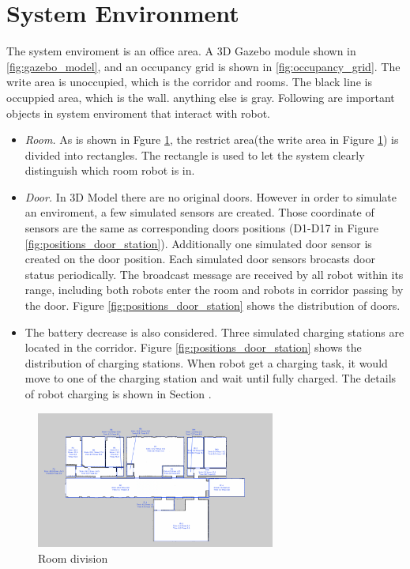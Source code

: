 \section{System Environment}
The system enviroment is an office area. A 3D Gazebo module shown in \ref{fig:gazebo_model}, and an occupancy grid is shown in \ref{fig:occupancy_grid}. The write area is unoccupied, which is the corridor and rooms. The black line is occuppied area, which is the wall. anything else is gray.
Following are important objects in system enviroment that interact with robot.
\begin{itemize}
	\item \textsl{Room.} As is shown in Fgure \ref{fig:room_division}, the restrict area(the write area in Figure \ref{fig:room_division}) is divided into rectangles. The rectangle is used to let the system clearly distinguish which room robot is in.
	\item \textsl{Door.} In 3D Model there are no original doors. However in order to simulate an enviroment, a few simulated sensors are created. Those coordinate of sensors are the same as corresponding doors positions (D1-D17 in Figure \ref{fig:positions_door_station}).
	Additionally one simulated door sensor is created on the door position. Each simulated door sensors brocasts door status periodically. The broadcast message are received by all robot within its range, including both robots enter the room and robots in corridor passing by the door.
	Figure \ref{fig:positions_door_station} shows the distribution of doors.
	\item {} The battery decrease is also considered. Three simulated charging stations are located in the corridor. Figure \ref{fig:positions_door_station} shows the distribution of charging stations. 
	When robot get a charging task, it would move to one of the charging station and wait until fully charged. The details of robot charging is shown in Section .
	
\end{itemize}

\begin{figure}[htbp]
	\centering
	\includegraphics[width = 0.7\textwidth]{content/images/ch3/room_division.png}
	\caption{Room division}
	\label{fig:room_division}
\end{figure}

